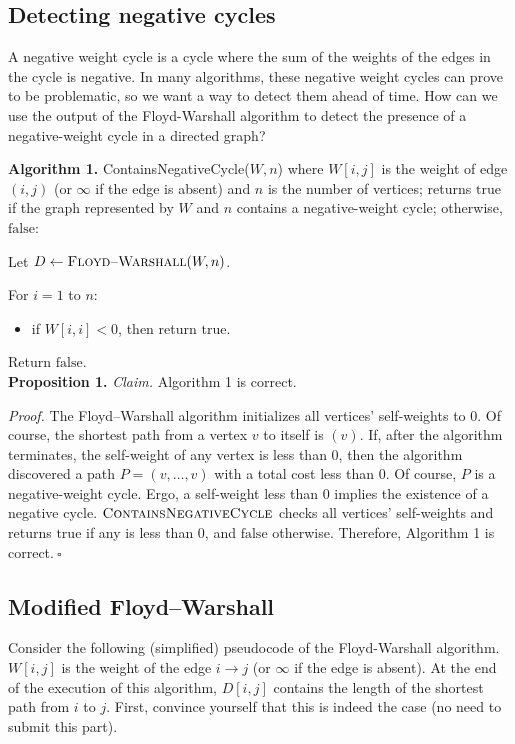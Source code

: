 \subsection{Detecting negative cycles}
A negative weight cycle is a cycle where the sum of the weights of the edges in the cycle is negative. In many algorithms, these negative weight cycles can prove to be problematic, so we want a way to detect them ahead of time. How can we use the output of the Floyd-Warshall algorithm to detect the presence
of a negative-weight cycle in a directed graph?
\begin{solution}

\textbf{Algorithm 1. }{\sc ContainsNegativeCycle}($W,n$) where $W[i,j]$ is the weight of edge $(i,j)$ (or $\infty$ if the edge is absent) and $n$ is the number of vertices; returns $\mathrm{true}$ if the graph represented by $W$ and $n$ contains a negative-weight cycle; otherwise, $\mathrm{false}$:

Let $D\leftarrow\textsc{Floyd--Warshall}(W,n)$.

For $i=1$ to $n$:
\begin{itemize}
    \item if $W[i,i]<0$, then return $\mathrm{true}$.
\end{itemize}

Return $\mathrm{false}$.\\

\textbf{Proposition 1. }\textit{Claim. }Algorithm 1 is correct.

\textit{Proof. }The {\sc Floyd--Warshall} algorithm initializes all vertices' self-weights to $0$. Of course, the shortest path from a vertex $v$ to itself is $(v)$. If, after the algorithm terminates, the self-weight of any vertex is less than $0$, then the algorithm discovered a path $P=(v,\dots,v)$ with a total cost less than $0$. Of course, $P$ is a negative-weight cycle. Ergo, a self-weight less than $0$ implies the existence of a negative cycle. $\textsc{ContainsNegativeCycle}$ checks all vertices' self-weights and returns $\mathrm{true}$ if any is less than $0$, and $\mathrm{false}$ otherwise. Therefore, Algorithm 1 is correct.$~\square$
\end{solution}
\newpage
\subsection{Modified Floyd--Warshall}
Consider the following (simplified) pseudocode of the Floyd-Warshall algorithm. $W[i,j]$ is the weight of the edge $i\rightarrow j$ (or $\infty$ if the edge is absent). At the end of the execution of this algorithm, $D[i,j]$ contains the length of the shortest path from $i$ to $j$. First, convince yourself that this is indeed the case (no need to submit this part).

